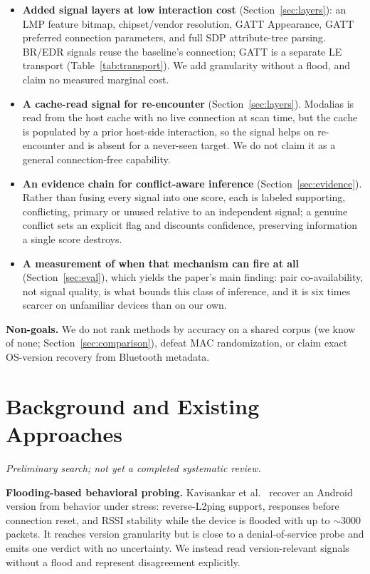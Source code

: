 \documentclass[conference]{IEEEtran}
\begin{document}
\begin{itemize}
  \item \textbf{Added signal layers at low interaction cost}
  (Section~\ref{sec:layers}): an LMP feature bitmap, chipset/vendor
  resolution, GATT Appearance, GATT preferred connection parameters, and full
  SDP attribute-tree parsing. BR/EDR signals reuse the baseline's connection;
  GATT is a separate LE transport (Table~\ref{tab:transport}). We add
  granularity without a flood, and claim no measured marginal cost.
  \item \textbf{A cache-read signal for re-encounter}
  (Section~\ref{sec:layers}). Modalias is read from the host cache with no
  live connection at scan time, but the cache is populated by a prior
  host-side interaction, so the signal helps on re-encounter and is absent for
  a never-seen target. We do not claim it as a general connection-free
  capability.
  \item \textbf{An evidence chain for conflict-aware inference}
  (Section~\ref{sec:evidence}). Rather than fusing every signal into one
  score, each is labeled supporting, conflicting, primary or unused relative
  to an independent signal; a genuine conflict sets an explicit flag and
  discounts confidence, preserving information a single score destroys.
  \item \textbf{A measurement of when that mechanism can fire at all}
  (Section~\ref{sec:eval}), which yields the paper's main finding: pair
  co-availability, not signal quality, is what bounds this class of
  inference, and it is six times scarcer on unfamiliar devices than on our
  own.
\end{itemize}

\noindent\textbf{Non-goals.} We do not rank methods by accuracy on a shared
corpus (we know of none; Section~\ref{sec:comparison}), defeat MAC
randomization, or claim exact OS-version recovery from Bluetooth metadata.

\section{Background and Existing Approaches}\label{sec:related}
\emph{Preliminary search; not yet a completed systematic review.}

\textbf{Flooding-based behavioral probing.} Kavisankar et
al.~\cite{kavisankar2024osid} recover an Android version from behavior under
stress: reverse-L2ping support, responses before connection reset, and RSSI
stability while the device is flooded with up to $\sim$3000 packets. It
reaches version granularity but is close to a denial-of-service probe and
emits one verdict with no uncertainty. We instead read version-relevant
signals without a flood and represent disagreement explicitly.
\end{document}
